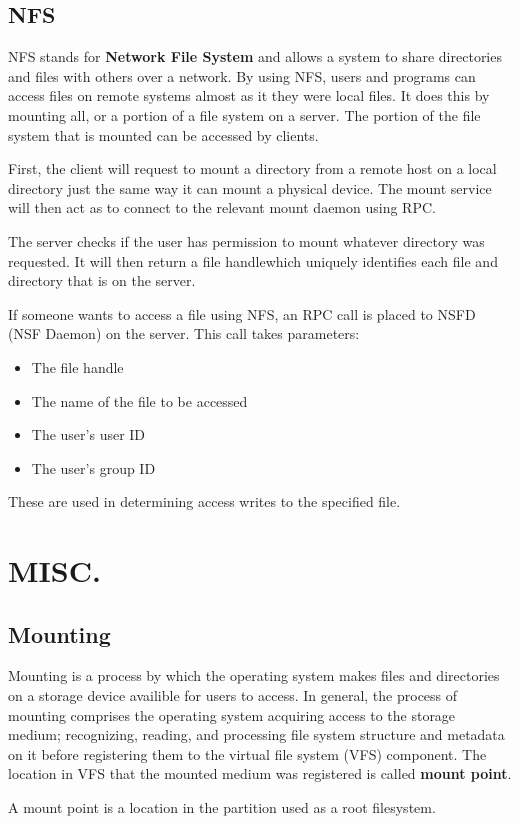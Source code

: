 \documentclass[12pt]{article}
\theoremstyle{definition}
\theoremstyle{definition}
\begin{document}
    \subsection{NFS}
        NFS stands for \textbf{Network File System} and allows a system to
        share directories and files with others over a network. By using NFS,
        users and programs can access files on remote systems almost as it they
        were local files. It does this by mounting all, or a portion of a file
        system on a server. The portion of the file system that is mounted can
        be accessed by clients.\par First, the client will request to mount
        a directory from a remote host on a local directory just the same way
        it can mount a physical device. The mount service will then act as to
        connect to the relevant mount daemon using RPC.\par The server checks
        if the user has permission to mount whatever directory was requested.
        It will then return a file handlewhich uniquely identifies each file
        and directory that is on the server. \par If someone wants to access
        a file using NFS, an RPC call is placed to NSFD (NSF Daemon) on the
        server. This call takes parameters:
        \begin{itemize}
            \item The file handle
            \item The name of the file to be accessed
            \item The user's user ID
            \item The user's group ID
        \end{itemize}
        These are used in determining access writes to the specified file. 
\section{MISC.}
    \subsection{Mounting}
        Mounting is a process by which the operating system makes files and 
        directories on a storage device availible for users to access. 
        In general, the process of mounting comprises the operating system 
        acquiring access to the storage medium; recognizing, reading, and 
        processing file system structure and metadata on it before registering 
        them to the virtual file system (VFS) component. The location in VFS 
        that the mounted medium was registered is called \textbf{mount point}.
        \par A mount point is a location in the partition used as a root
        filesystem. 
\end{document}
